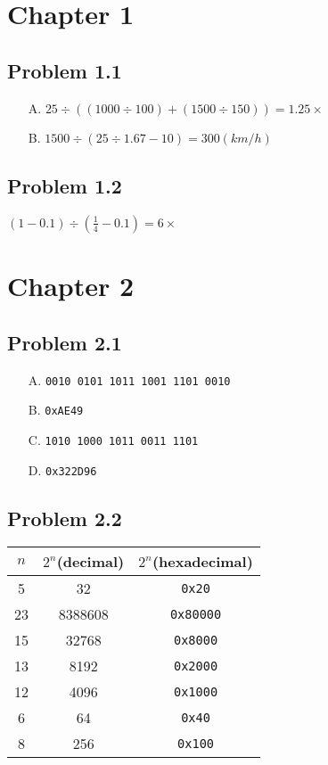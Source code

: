 \documentclass[a4paper]{article}
\begin{document}
\setmonofont{Courier New}
\section*{Chapter 1}

\subsection*{Problem 1.1}
\begin{enumerate}
\item [A.] $25\div((1000\div100)+(1500\div150))=1.25\times$
\item [B.] $1500\div(25\div1.67-10)=300(km/h)$
\end{enumerate}

\subsection*{Problem 1.2}
$(1-0.1)\div(\frac{1}{4}-0.1)=6\times$

\section*{Chapter 2}

\subsection*{Problem 2.1}
\begin{enumerate}
    \item [A.] \texttt{0010 0101 1011 1001 1101 0010}
    \item [B.] \texttt{0xAE49}
    \item [C.] \texttt{1010 1000 1011 0011 1101}
    \item [D.] \texttt{0x322D96}
\end{enumerate}

\subsection*{Problem 2.2}
\begin{tabular}{ccc}
    $n$&$2^n$(decimal)&$2^n$(hexadecimal)\\
    \hline
    5   &32     &\texttt{0x20}\\
    23  &8388608&\texttt{0x80000}\\
    15  &32768  &\texttt{0x8000}\\
    13  &8192   &\texttt{0x2000}\\
    12  &4096   &\texttt{0x1000}\\
    6   &64     &\texttt{0x40}\\
    8   &256    &\texttt{0x100}
\end{tabular}
\end{document}
